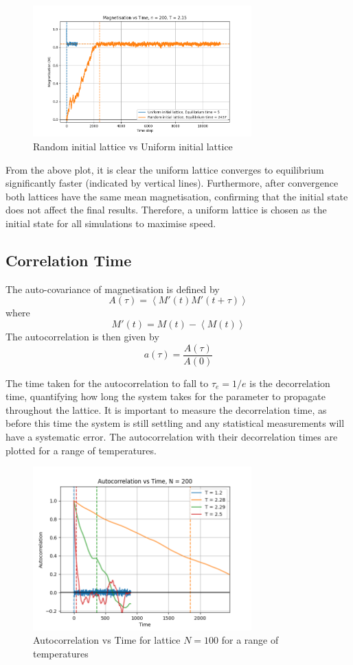 \documentclass[a4paper, 12pt]{article}
\begin{document}
\begin{figure}[H]
\centering
\includegraphics[width=0.75\textwidth]{./resources/random_vs_uniform.png}
\caption{Random initial lattice vs Uniform initial lattice}
\end{figure}

From the above plot, it is clear the uniform lattice converges to equilibrium significantly faster (indicated by vertical lines). Furthermore, after convergence both lattices have the same mean magnetisation, confirming that the initial state does not affect the final results. Therefore, a uniform lattice is chosen as the initial state for all simulations to maximise speed. 

	\subsection{Correlation Time}
The auto-covariance of magnetisation is defined by
\[ A( \tau ) = \left< M'(t) M'(t + \tau) \right> \]
where
\[ M'(t) = M(t) - \left< M(t) \right> \]
The autocorrelation is then given by
\[ a(\tau) = \frac{A(\tau)}{A(0)} \]

The time taken for the autocorrelation to fall to \( \tau_e = 1/e\) is the decorrelation time, quantifying how long the system takes for the parameter to propagate throughout the lattice. It is important to measure the decorrelation time, as before this time the system is still settling and any statistical measurements will have a systematic error. The autocorrelation with their decorrelation times are plotted for a range of temperatures.

\begin{figure}[H]
\centering
\includegraphics[width=0.75\textwidth]{./resources/decorrelation_time.png}
\caption{Autocorrelation vs Time for lattice \(N=100\) for a range of temperatures}
\end{figure}
\end{document}
